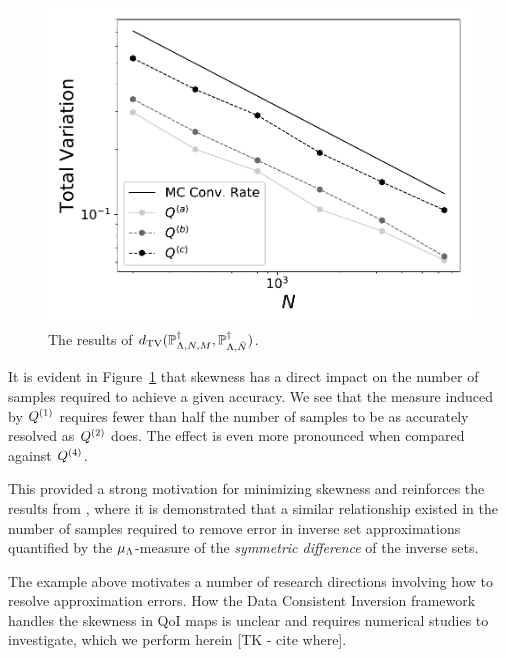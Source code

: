 \begin{ex}
\begin{figure}[ht]
\begin{minipage}{.65\textwidth}
\end{minipage}
\begin{minipage}{.65\textwidth}
		\includegraphics[width=\linewidth]{./images/Plot-reg_BigN_40000_reg_M_1_rand_I_100000}
\end{minipage}
\caption{The results of $d_\text{TV}(\mathbb{P}_{{\Lambda},N,M}^\dagger, \mathbb{P}_{{\Lambda},\bar{N}}^\dagger)$.}
\label{fig:skew}
\end{figure}

It is evident in Figure~\ref{fig:skew} that skewness has a direct impact on the number of samples required to achieve a given accuracy.
We see that the measure induced by $Q^{(1)}$ requires fewer than half the number of samples to be as accurately resolved as $Q^{(2)}$ does.
The effect is even more pronounced when compared against $Q^{(4)}$.

This provided a strong motivation for minimizing skewness and reinforces the results from \cite{BPW_2015}, where it is demonstrated that a similar relationship existed in the number of samples required to remove error in inverse set approximations quantified by the $\mu_{{\Lambda}}$-measure of the {\em symmetric difference} of the inverse sets.

\end{ex}

The example above motivates a number of research directions involving how to resolve approximation errors.
How the Data Consistent Inversion framework handles the skewness in QoI maps is unclear and requires numerical studies to investigate, which we perform herein [TK - cite where].


